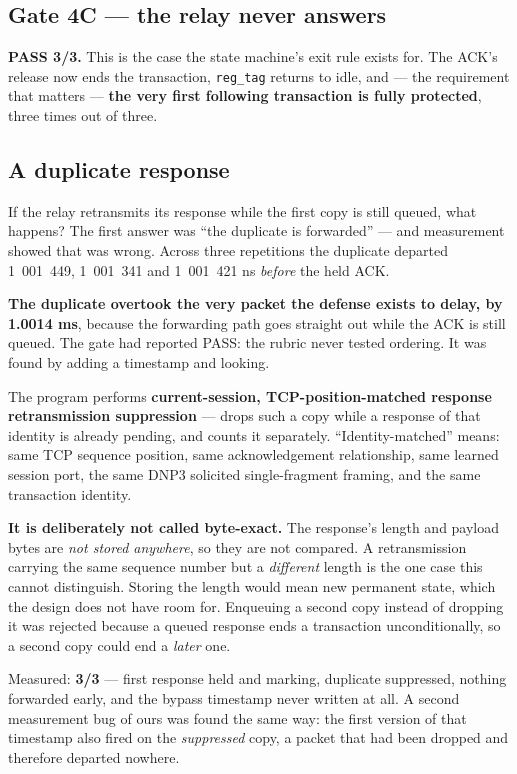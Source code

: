 \documentclass[10pt,a4paper,oneside]{article}
\newcommand{\num}[1]{\mbox{#1}}
\newcommand{\code}[1]{\texttt{\small #1}}
\begin{document}
\subsection{Gate 4C --- the relay never answers}

\textbf{PASS 3/3.} This is the case the state machine's exit rule exists for. The
ACK's release now ends the transaction, \code{reg\_tag} returns to idle, and --- the
requirement that matters --- \textbf{the very first following transaction is fully
protected}, three times out of three.

\subsection{A duplicate response}

If the relay retransmits its response while the first copy is still queued, what happens?
The first answer was ``the duplicate is forwarded'' --- and measurement showed that was
wrong. Across three repetitions the duplicate departed \num{1 001 449}, \num{1 001 341} and
\num{1 001 421} ns \emph{before} the held ACK.

\textbf{The duplicate overtook the very packet the defense exists to delay, by
\num{1.0014} ms}, because the forwarding path goes straight out while the ACK is still
queued. The gate had reported PASS: the rubric never tested ordering. It was found by adding
a timestamp and looking.

The program performs \textbf{current-session, TCP-position-matched response
retransmission suppression} --- drops such a copy while a response of that identity is
already pending, and counts it separately. ``Identity-matched'' means: same TCP sequence
position, same acknowledgement relationship, same learned session port, the same DNP3
solicited single-fragment framing, and the same transaction identity.

\textbf{It is deliberately not called byte-exact.} The response's length and payload bytes
are \emph{not stored anywhere}, so they are not compared. A retransmission carrying the same
sequence number but a \emph{different} length is the one case this cannot distinguish.
Storing the length would mean new permanent state, which the design does not have room for.
Enqueuing a second copy instead of dropping it was rejected because a queued response ends a
transaction unconditionally, so a second copy could end a \emph{later} one.

Measured: \textbf{3/3} --- first response held and marking, duplicate suppressed,
nothing forwarded early, and the bypass timestamp never written at all. A second measurement
bug of ours was found the same way: the first version of that timestamp also fired on the
\emph{suppressed} copy, a packet that had been dropped and therefore departed nowhere.
\end{document}
